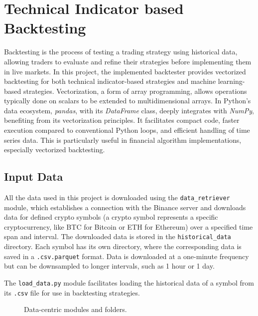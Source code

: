 \chapter{Technical Indicator based Backtesting}
\label{chap:technical_backtesting}


Backtesting is the process of testing a trading strategy using historical data, allowing traders to evaluate and refine their
strategies before implementing them in live markets.
In this project, the implemented backtester provides vectorized backtesting for both technical indicator-based strategies
and machine learning-based strategies.
Vectorization, a form of array programming, allows operations typically done on scalars to be extended to multidimensional arrays.
In Python's data ecosystem, \textit{pandas}, with its \textit{DataFrame} class, deeply integrates with \textit{NumPy}, benefiting from
its vectorization principles.
It facilitates compact code, faster execution compared to conventional Python loops, and efficient handling of time series data.
This is particularly useful in financial algorithm implementations, especially vectorized backtesting.

\section{Input Data}


All the data used in this project is downloaded using the \texttt{data\_retriever} module, which establishes a connection with the Binance server
 and downloads data for defined crypto symbols (a crypto symbol represents a specific cryptocurrency,
like BTC for Bitcoin or ETH for Ethereum) over a specified time span and interval.
The downloaded data is stored in the \texttt{historical\_data} directory. Each symbol has its own directory, where the corresponding data is
saved in a \texttt{.csv.parquet} format.
Data is downloaded at a one-minute frequency but can be downsampled to longer intervals, such as 1 hour or 1 day.

The \texttt{load\_data.py} module facilitates loading the historical data of a symbol from its \texttt{.csv} file for use in backtesting strategies.

\begin{figure}[h]

\caption{Data-centric modules and folders.}\label{fig:inputdata}
\end{figure}


